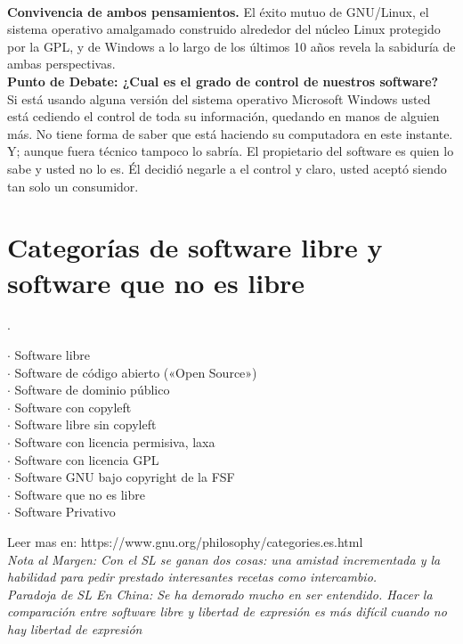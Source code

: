 \\
{\bf Convivencia de ambos pensamientos.}
El éxito mutuo de GNU/Linux, el sistema operativo amalgamado construido alrededor del núcleo
Linux protegido por la GPL, y de Windows a lo largo de los últimos 10 años revela la sabiduría de
ambas perspectivas.
\\
{\bf Punto de Debate: ¿Cual es el grado de control de nuestros software?}
\\
Si está usando alguna versión del sistema operativo Microsoft Windows usted está cediendo el control de toda su información, quedando en manos de alguien más. No tiene forma de saber que está haciendo su computadora en este instante.
\\
Y; aunque fuera  técnico tampoco lo sabría. El propietario del software es quien lo sabe y usted no lo es. 
Él decidió negarle a el control y claro, usted aceptó siendo tan solo un consumidor.

\section{Categorías de software libre y software que no es libre}
	.
\begin{description}
	\item[$\cdot$ Software libre]
	\item[$\cdot$ Software de código abierto («Open Source»)]
	\item[$\cdot$ Software de dominio público]
	\item[$\cdot$ Software con copyleft]
	\item[$\cdot$ Software libre sin copyleft]
	\item[$\cdot$ Software con licencia permisiva, laxa]
	\item[$\cdot$ Software con licencia GPL]
	\item[$\cdot$ Software GNU bajo copyright de la FSF]
	\item[$\cdot$ Software que no es libre]
	\item[$\cdot$ Software Privativo]
\end{description}

Leer mas en: https://www.gnu.org/philosophy/categories.es.html
\\
{\it
\emph{Nota al Margen:} Con el SL se ganan dos cosas: una amistad incrementada y la habilidad para pedir prestado interesantes recetas como intercambio.
\\
\emph{Paradoja de SL En China:}
Se ha demorado mucho en ser entendido. Hacer la comparación entre software libre y libertad de expresión es más difícil cuando no hay libertad de expresión
}
